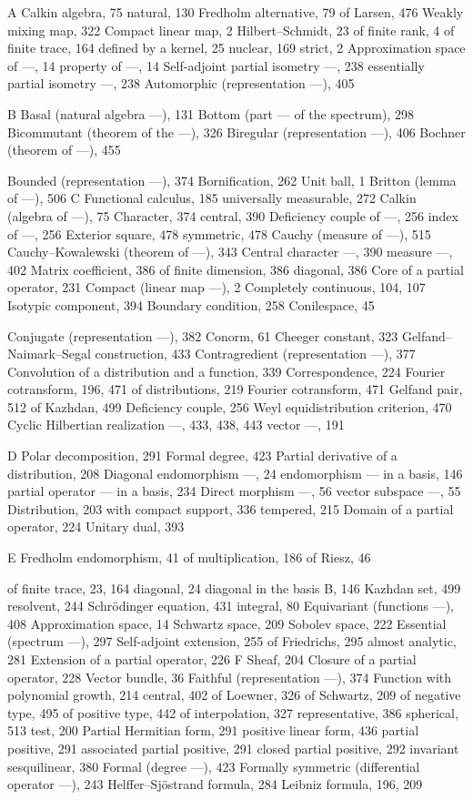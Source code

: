 
A Calkin algebra, 75 natural, 130 Fredholm alternative, 79 of Larsen, 476 Weakly mixing map,
322
Compact linear map, 2 Hilbert--Schmidt, 23 of finite rank, 4 of finite trace, 164 defined by a kernel, 25 nuclear, 169 strict, 2 Approximation space of ---, 14 property of ---, 14 Self-adjoint partial isometry ---, 238 essentially partial isometry ---, 238 Automorphic (representation ---), 405

B Basal (natural algebra ---), 131 Bottom (part --- of the spectrum), 298 Bicommutant (theorem of the ---), 326 Biregular (representation ---), 406 Bochner (theorem of ---), 455

Bounded (representation ---), 374 Bornification, 262 Unit ball, 1 Britton (lemma of ---), 506 C Functional calculus, 185 universally measurable, 272 Calkin (algebra of ---), 75 Character, 374 central, 390 Deficiency couple of ---, 256 index of ---, 256 Exterior square, 478 symmetric, 478 Cauchy (measure of ---), 515 Cauchy--Kowalewski (theorem of ---), 343 Central character ---, 390 measure ---, 402 Matrix coefficient, 386 of finite dimension, 386 diagonal, 386 Core of a partial operator, 231 Compact (linear map ---), 2 Completely continuous, 104, 107 Isotypic component, 394 Boundary condition, 258 Conilespace, 45

Conjugate (representation ---), 382 Conorm, 61 Cheeger constant, 323 Gelfand--Naimark--Segal construction, 433 Contragredient (representation ---), 377 Convolution of a distribution and a function, 339 Correspondence, 224 Fourier cotransform, 196, 471 of distributions, 219 Fourier cotransform, 471 Gelfand pair, 512 of Kazhdan, 499 Deficiency couple, 256 Weyl equidistribution criterion, 470 Cyclic Hilbertian realization ---, 433, 438, 443 vector ---, 191

D Polar decomposition, 291 Formal degree, 423 Partial derivative of a distribution, 208 Diagonal endomorphism ---, 24 endomorphism --- in a basis, 146 partial operator --- in a basis, 234 Direct morphism ---, 56 vector subspace ---, 55 Distribution, 203 with compact support, 336 tempered, 215 Domain of a partial operator, 224 Unitary dual, 393

E Fredholm endomorphism, 41 of multiplication, 186 of Riesz, 46

of finite trace, 23, 164 diagonal, 24 diagonal in the basis B, 146 Kazhdan set, 499 resolvent, 244 Schrödinger equation, 431 integral, 80 Equivariant (functions ---), 408 Approximation space, 14 Schwartz space, 209 Sobolev space, 222 Essential (spectrum ---), 297 Self-adjoint extension, 255 of Friedrichs, 295 almost analytic, 281 Extension of a partial operator, 226 F Sheaf, 204 Closure of a partial operator, 228 Vector bundle, 36 Faithful (representation ---), 374 Function with polynomial growth, 214 central, 402 of Loewner, 326 of Schwartz, 209 of negative type, 495 of positive type, 442 of interpolation, 327 representative, 386 spherical, 513 test, 200 Partial Hermitian form, 291 positive linear form, 436 partial positive, 291 associated partial positive, 291 closed partial positive, 292 invariant sesquilinear, 380 Formal (degree ---), 423 Formally symmetric (differential operator ---), 243 Helffer--Sjöstrand formula, 284 Leibniz formula, 196, 209

